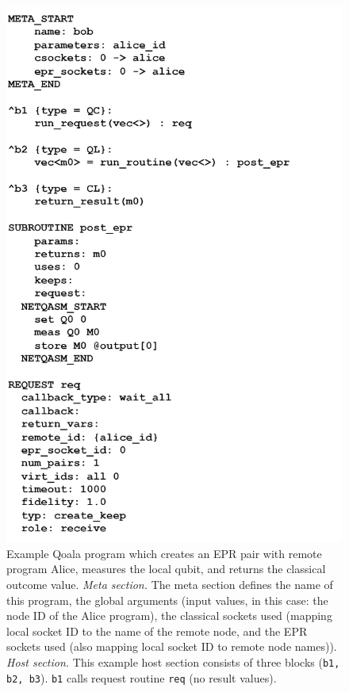 \begin{figure}[ht]
    \centering
    \includegraphics[scale=1.0]{figures/qoala/appendix_example_full_program.png}
    \caption{Example Qoala program which creates an EPR pair with remote program Alice, measures the local qubit, and returns the classical outcome value.
    \textit{Meta section.} The meta section defines the name of this program, the global arguments (input values, in this case: the node ID of the Alice program),
    the classical sockets used (mapping local socket ID to the name of the remote node, and the EPR sockets used (also mapping local socket ID to remote node names)).
    \textit{Host section.} This example host section consists of three blocks (\texttt{b1, b2, b3}). \texttt{b1} calls request routine \texttt{req} (no result values).
}
\end{figure}
